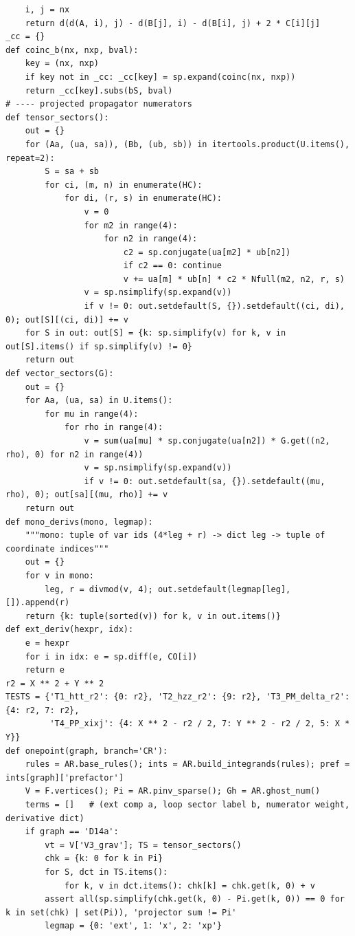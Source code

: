 \documentclass[10pt]{article}
\begin{document}
\begin{lstlisting}
    i, j = nx
    return d(d(A, i), j) - d(B[j], i) - d(B[i], j) + 2 * C[i][j]
_cc = {}
def coinc_b(nx, nxp, bval):
    key = (nx, nxp)
    if key not in _cc: _cc[key] = sp.expand(coinc(nx, nxp))
    return _cc[key].subs(bS, bval)
# ---- projected propagator numerators
def tensor_sectors():
    out = {}
    for (Aa, (ua, sa)), (Bb, (ub, sb)) in itertools.product(U.items(), repeat=2):
        S = sa + sb
        for ci, (m, n) in enumerate(HC):
            for di, (r, s) in enumerate(HC):
                v = 0
                for m2 in range(4):
                    for n2 in range(4):
                        c2 = sp.conjugate(ua[m2] * ub[n2])
                        if c2 == 0: continue
                        v += ua[m] * ub[n] * c2 * Nfull(m2, n2, r, s)
                v = sp.nsimplify(sp.expand(v))
                if v != 0: out.setdefault(S, {}).setdefault((ci, di), 0); out[S][(ci, di)] += v
    for S in out: out[S] = {k: sp.simplify(v) for k, v in out[S].items() if sp.simplify(v) != 0}
    return out
def vector_sectors(G):
    out = {}
    for Aa, (ua, sa) in U.items():
        for mu in range(4):
            for rho in range(4):
                v = sum(ua[mu] * sp.conjugate(ua[n2]) * G.get((n2, rho), 0) for n2 in range(4))
                v = sp.nsimplify(sp.expand(v))
                if v != 0: out.setdefault(sa, {}).setdefault((mu, rho), 0); out[sa][(mu, rho)] += v
    return out
def mono_derivs(mono, legmap):
    """mono: tuple of var ids (4*leg + r) -> dict leg -> tuple of coordinate indices"""
    out = {}
    for v in mono:
        leg, r = divmod(v, 4); out.setdefault(legmap[leg], []).append(r)
    return {k: tuple(sorted(v)) for k, v in out.items()}
def ext_deriv(hexpr, idx):
    e = hexpr
    for i in idx: e = sp.diff(e, CO[i])
    return e
r2 = X ** 2 + Y ** 2
TESTS = {'T1_htt_r2': {0: r2}, 'T2_hzz_r2': {9: r2}, 'T3_PM_delta_r2': {4: r2, 7: r2},
         'T4_PP_xixj': {4: X ** 2 - r2 / 2, 7: Y ** 2 - r2 / 2, 5: X * Y}}
def onepoint(graph, branch='CR'):
    rules = AR.base_rules(); ints = AR.build_integrands(rules); pref = ints[graph]['prefactor']
    V = F.vertices(); Pi = AR.pinv_sparse(); Gh = AR.ghost_num()
    terms = []   # (ext comp a, loop sector label b, numerator weight, derivative dict)
    if graph == 'D14a':
        vt = V['V3_grav']; TS = tensor_sectors()
        chk = {k: 0 for k in Pi}
        for S, dct in TS.items():
            for k, v in dct.items(): chk[k] = chk.get(k, 0) + v
        assert all(sp.simplify(chk.get(k, 0) - Pi.get(k, 0)) == 0 for k in set(chk) | set(Pi)), 'projector sum != Pi'
        legmap = {0: 'ext', 1: 'x', 2: 'xp'}

\end{lstlisting}
\end{document}
